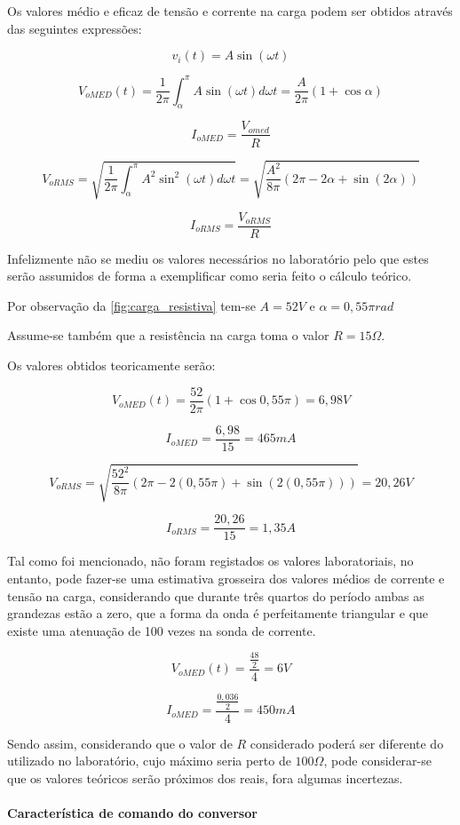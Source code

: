 \documentclass[a4paper,11pt]{article}
\numberwithin{equation}{section}
\begin{document}
Os valores médio e eficaz de tensão e corrente na carga podem ser obtidos através das seguintes expressões:

\[v_i(t)=A \sin(\omega t)\]

\[V_{oMED} (t) = \frac{1}{2\pi} \int_{\alpha}^{\pi} A \sin(\omega t) d \omega t = \frac{A}{2\pi} (1+ \cos\alpha)\]

\[I_{oMED}= \frac{V_{omed}}{R}\]

\[V_{oRMS} = \sqrt{ \frac{1}{2\pi} \int_{\alpha}^{\pi} A^2 \sin^2 (\omega t) d\omega t} = \sqrt{ \frac{A^2}{8 \pi} (2\pi - 2\alpha + \sin(2\alpha))} \]

\[I_{oRMS}= \frac{V_{oRMS}}{R}\]



Infelizmente não se mediu os valores necessários no laboratório pelo que estes serão assumidos de forma a exemplificar como seria feito o cálculo teórico.

Por observação da \autoref{fig:carga_resistiva} tem-se $A=52 V$ e $\alpha=0,55\pi rad$

Assume-se também que a resistência na carga toma o valor $R=15 \Omega$.

Os valores obtidos teoricamente serão:

\[V_{oMED} (t) = \frac{52}{2\pi} (1+ \cos0,55\pi) = 6,98 V\]

\[I_{oMED}= \frac{6,98}{15} = 465 mA\]

\[V_{oRMS} = \sqrt{ \frac{52^2}{8 \pi} (2\pi - 2(0,55\pi) + \sin(2(0,55\pi)))} = 20,26 V \]

\[I_{oRMS}= \frac{20,26}{15} = 1,35 A\]

Tal como foi mencionado, não foram registados os valores laboratoriais, no entanto, pode fazer-se uma estimativa grosseira dos valores médios de corrente e tensão na carga, considerando que durante três quartos do período ambas as grandezas estão a zero, que a forma da onda é perfeitamente triangular e que existe uma atenuação de 100 vezes na sonda de corrente.

\[V_{oMED} (t) = \frac{\frac{48}{2}}{4} = 6 V\]

\[I_{oMED}= \frac{\frac{0,036}{2}}{4} = 450 mA\]

Sendo assim, considerando que o valor de $R$ considerado poderá ser diferente do utilizado no laboratório, cujo máximo seria perto de $100 \Omega$, pode considerar-se que os valores teóricos serão próximos dos reais, fora algumas incertezas.

\paragraph{Característica de comando do conversor}\mbox{}\
\end{document}
